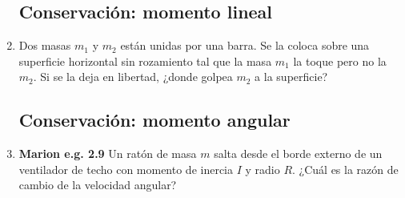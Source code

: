 \documentclass[11pt,spanish,a4paper]{article}
\begin{document}
\begin{enumerate}
%
%

\vspace{1cm}
\subsection*{Conservación: momento lineal}

\item Dos masas \(m_1\) y \(m_2\) están unidas por una barra.
Se la coloca sobre una superficie horizontal sin rozamiento tal que la masa \(m_1\) la toque pero no la \(m_2\). 
Si se la deja en libertad, ¿donde golpea \(m_2\) a la superficie?


\subsection*{Conservación: momento angular}
\item \textbf{Marion e.g. 2.9}
Un ratón de masa \(m\) salta desde el borde externo de un ventilador de techo con momento de inercia \(I\) y radio \(R\).
¿Cuál es la razón de cambio de la velocidad angular?



\end{enumerate}
\end{document}
